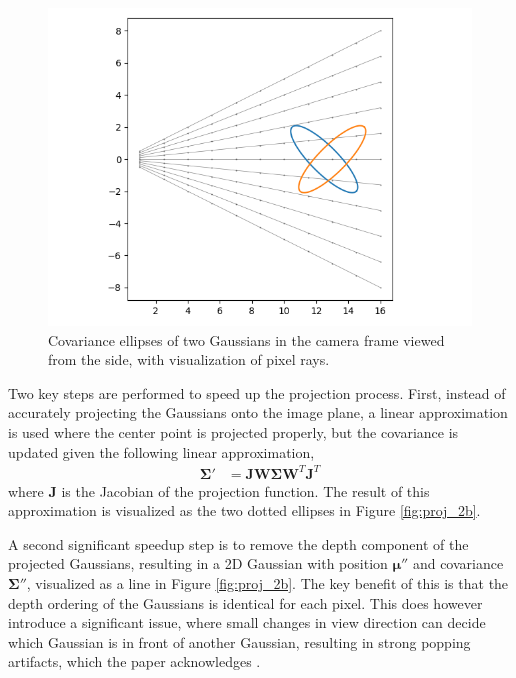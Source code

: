\begin{figure}[t]
    \centering
    \includegraphics[width=\linewidth]{images/proja.png}
    \caption{Covariance ellipses of two Gaussians in the camera frame viewed from the side, with visualization of pixel rays.}
    \label{fig:proj_2a}
\end{figure}


Two key steps are performed to speed up the projection process.
First, instead of accurately projecting the Gaussians onto the image plane, a linear approximation is used where the center point is projected properly, but the covariance is updated given the following linear approximation,
\begin{align}
    \bm{\Sigma'} & = \bm{J} \bm{W} \bm{\Sigma} \bm{W}^T \bm{J}^T \label{eq:linear_approx}
\end{align}
where $\bm{J}$ is the Jacobian of the projection function.
The result of this approximation is visualized as the two dotted ellipses in Figure \ref{fig:proj_2b}.

A second significant speedup step is to remove the depth component of the projected Gaussians, resulting in a 2D Gaussian with position $\bm{\mu}''$ and covariance $\bm{\Sigma}''$, visualized as a line in Figure \ref{fig:proj_2b}.
The key benefit of this is that the depth ordering of the Gaussians is identical for each pixel.
This does however introduce a significant issue, where small changes in view direction can decide which Gaussian is in front of another Gaussian, resulting in strong popping artifacts, which the paper acknowledges \cite[Sec 7.4]{kerbl3DGaussianSplatting2023}.

